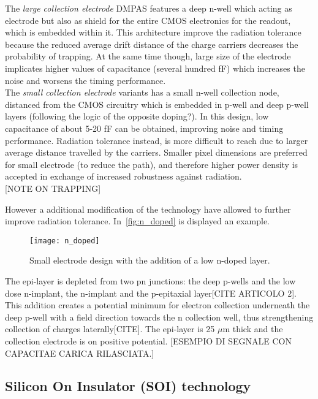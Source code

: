 The \textit{large collection electrode} DMPAS features a deep n-well which acting as electrode but also as shield for the entire CMOS electronics for the readout, which is embedded within it. This architecture improve the radiation tolerance because the reduced average drift distance of the charge carriers decreases the probability of trapping. At the same time though, large size of the electrode implicates higher values of capacitance (several hundred fF) which increases the noise and worsens the timing performance.\\
The \textit{small collection electrode} variants has a small n-well collection node, distanced from the CMOS circuitry which is embedded in p-well and deep p-well layers (following the logic of the opposite doping?). In this design, low capacitance of about 5-20 fF can be obtained, improving noise and timing performance.
Radiation tolerance instead, is more difficult to reach due to larger average distance travelled by the carriers. Smaller pixel dimensions are preferred for small electrode (to reduce the path), and therefore higher power density is accepted in exchange of increased robustness against radiation.\\

[NOTE ON TRAPPING]


However a additional modification of the technology have allowed to further improve radiation tolerance. In~\autoref{fig:n_doped} is displayed an example.\\

\begin{figure}[h!]
\centering
\texttt{[image: n\_doped]}
\caption{Small electrode design with the addition of a low n-doped layer.}
\label{fig:n_doped}
\end{figure}

The epi-layer is depleted from two pn junctions: the deep p-wells and the low dose n-implant, the n-implant and the p-epitaxial layer[CITE ARTICOLO 2]. This addition creates a potential minimum for electron collection underneath the deep p-well with a field direction towards the n collection well, thus strengthening collection of charges laterally[CITE]. The epi-layer is 25 $\mu$m thick and the collection electrode is on positive potential. [ESEMPIO DI SEGNALE CON CAPACITAE CARICA RILASCIATA.]


\subsection{Silicon On Insulator (SOI) technology}

